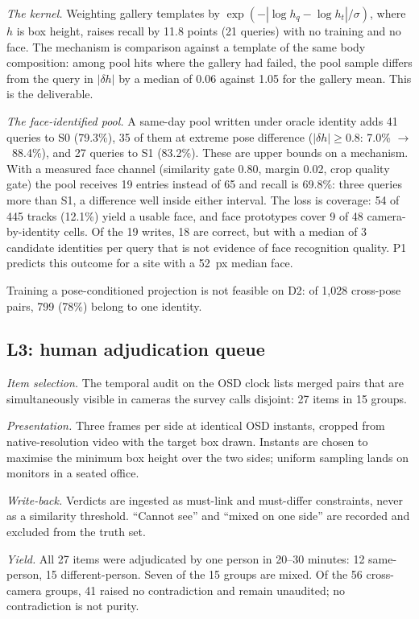 \documentclass[journal]{IEEEtran}
\newcommand{\ra}{$\rightarrow$}
\begin{document}
\emph{The kernel.} Weighting gallery templates by $\exp(-|\log h_q - \log h_t| / \sigma)$, where $h$ is box height, raises recall by 11.8 points (21 queries) with no training and no face. The mechanism is comparison against a template of the same body composition: among pool hits where the gallery had failed, the pool sample differs from the query in $|\delta h|$ by a median of 0.06 against 1.05 for the gallery mean. This is the deliverable.

\emph{The face-identified pool.} A same-day pool written under oracle identity adds 41 queries to S0 (79.3\%), 35 of them at extreme pose difference ($|\delta h| \ge 0.8$: 7.0\% \ra\ 88.4\%), and 27 queries to S1 (83.2\%). These are upper bounds on a mechanism. With a measured face channel (similarity gate 0.80, margin 0.02, crop quality gate) the pool receives 19 entries instead of 65 and recall is 69.8\%: three queries more than S1, a difference well inside either interval. The loss is coverage: 54 of 445 tracks (12.1\%) yield a usable face, and face prototypes cover 9 of 48 camera-by-identity cells. Of the 19 writes, 18 are correct, but with a median of 3 candidate identities per query that is not evidence of face recognition quality. P1 predicts this outcome for a site with a 52~px median face.

Training a pose-conditioned projection is not feasible on D2: of 1,028 cross-pose pairs, 799 (78\%) belong to one identity.

\subsection{L3: human adjudication queue}\label{sec:l3}
\emph{Item selection.} The temporal audit on the OSD clock lists merged pairs that are simultaneously visible in cameras the survey calls disjoint: 27 items in 15 groups.

\emph{Presentation.} Three frames per side at identical OSD instants, cropped from native-resolution video with the target box drawn. Instants are chosen to maximise the minimum box height over the two sides; uniform sampling lands on monitors in a seated office.

\emph{Write-back.} Verdicts are ingested as must-link and must-differ constraints, never as a similarity threshold. ``Cannot see'' and ``mixed on one side'' are recorded and excluded from the truth set.

\emph{Yield.} All 27 items were adjudicated by one person in 20--30 minutes: 12 same-person, 15 different-person. Seven of the 15 groups are mixed. Of the 56 cross-camera groups, 41 raised no contradiction and remain unaudited; no contradiction is not purity.
\end{document}
